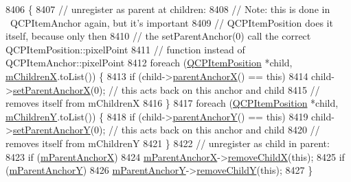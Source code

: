 \begin{DoxyCode}
8406                                   \{
8407   \textcolor{comment}{// unregister as parent at children:}
8408   \textcolor{comment}{// Note: this is done in ~QCPItemAnchor again, but it's important}
8409   \textcolor{comment}{// QCPItemPosition does it itself, because only then}
8410   \textcolor{comment}{//       the setParentAnchor(0) call the correct QCPItemPosition::pixelPoint}
8411   \textcolor{comment}{//       function instead of QCPItemAnchor::pixelPoint}
8412   \textcolor{keywordflow}{foreach} (\hyperlink{class_q_c_p_item_position}{QCPItemPosition} *child, \hyperlink{class_q_c_p_item_anchor_ab8fd931923357898286ae604e1380fa7}{mChildrenX}.toList()) \{
8413     \textcolor{keywordflow}{if} (child->\hyperlink{class_q_c_p_item_position_a485abba71c8552086c5f68e95dca7f9a}{parentAnchorX}() == \textcolor{keyword}{this})
8414       child->\hyperlink{class_q_c_p_item_position_add71461a973927c74e42179480916d9c}{setParentAnchorX}(0); \textcolor{comment}{// this acts back on this anchor and child}
8415                                   \textcolor{comment}{// removes itself from mChildrenX}
8416   \}
8417   \textcolor{keywordflow}{foreach} (\hyperlink{class_q_c_p_item_position}{QCPItemPosition} *child, \hyperlink{class_q_c_p_item_anchor_a6d58eb782eda4d96a95067354305b139}{mChildrenY}.toList()) \{
8418     \textcolor{keywordflow}{if} (child->\hyperlink{class_q_c_p_item_position_a1502dba801cb20424b7e097399e372de}{parentAnchorY}() == \textcolor{keyword}{this})
8419       child->\hyperlink{class_q_c_p_item_position_add5ec1db9d19cec58a3b5c9e0a0c3f9d}{setParentAnchorY}(0); \textcolor{comment}{// this acts back on this anchor and child}
8420                                   \textcolor{comment}{// removes itself from mChildrenY}
8421   \}
8422   \textcolor{comment}{// unregister as child in parent:}
8423   \textcolor{keywordflow}{if} (\hyperlink{class_q_c_p_item_position_a41b4641d18c90997b9c01bf304181bf0}{mParentAnchorX})
8424     \hyperlink{class_q_c_p_item_position_a41b4641d18c90997b9c01bf304181bf0}{mParentAnchorX}->\hyperlink{class_q_c_p_item_anchor_a230b1d494cda63458e289bbe1b642599}{removeChildX}(\textcolor{keyword}{this});
8425   \textcolor{keywordflow}{if} (\hyperlink{class_q_c_p_item_position_afc6142a6a09c8fa41c44d3d54fadd737}{mParentAnchorY})
8426     \hyperlink{class_q_c_p_item_position_afc6142a6a09c8fa41c44d3d54fadd737}{mParentAnchorY}->\hyperlink{class_q_c_p_item_anchor_aa2394911d8fff3bd958b9f4f1994b64d}{removeChildY}(\textcolor{keyword}{this});
8427 \}
\end{DoxyCode}


